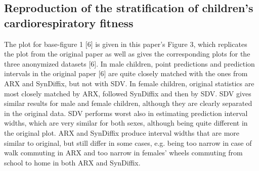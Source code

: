 \documentclass[10pt]{article}
\newcommand{\mycite}[1]{[#1]}
\begin{document}
%
%

\subsection*{Reproduction of the stratification of children's cardiorespiratory fitness}

The plot for base-figure 1 \mycite{6} is given in this paper's Figure 3, which replicates the plot from the original paper as well as gives the corresponding plots for the three anonymized datasets \mycite{6}.
In male children, point predictions and prediction intervals in the original paper \mycite{6} are quite closely matched with the ones from ARX and SynDiffix, but not with SDV. 
In female children, original statistics are most closely matched by ARX, followed SynDiffix and then by SDV.
SDV gives similar results for male and female children, although they are clearly separated in the original data. SDV performs worst also in estimating prediction interval widths, which are very similar for both sexes, although being quite different in the original plot. ARX and SynDiffix produce interval widths that are more similar to original, but still differ in some cases, e.g. being too narrow in case of walk commuting in ARX and too narrow in females' wheels commuting from school to home in both ARX and SynDiffix.
\end{document}
